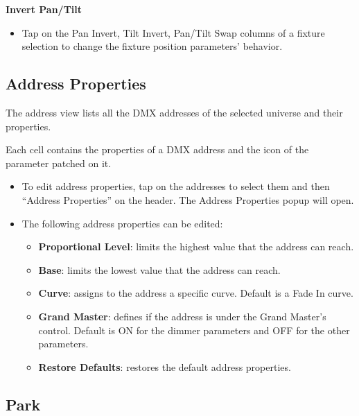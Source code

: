 \documentclass[
]{article}
\providecommand{\tightlist}{%
  \setlength{\itemsep}{0pt}\setlength{\parskip}{0pt}}
\begin{document}
\textbf{Invert Pan/Tilt}

\begin{itemize}
\tightlist
\item
  Tap on the Pan Invert, Tilt Invert, Pan/Tilt Swap columns of a fixture selection to change the fixture position parameters' behavior.
\end{itemize}

\hypertarget{Address-Properties-5.6}{%
\subsection{Address Properties}\label{Address-Properties-5.6}}

The address view lists all the DMX addresses of the selected universe and their properties.

Each cell contains the properties of a DMX address and the icon of the parameter patched on it.

\begin{itemize}
\tightlist
\item
  To edit address properties, tap on the addresses to select them and then ``Address Properties'' on the header. The Address Properties popup will open.
\end{itemize}

\begin{itemize}
\item
  The following address properties can be edited:

  \begin{itemize}
  \item
    \textbf{Proportional Level}: limits the highest value that the address can reach.
  \item
    \textbf{Base}: limits the lowest value that the address can reach.
  \item
    \textbf{Curve}: assigns to the address a specific curve. Default is a Fade In curve.
  \item
    \textbf{Grand Master}: defines if the address is under the Grand Master's control. Default is ON for the dimmer parameters and OFF for the other parameters.
  \item
    \textbf{Restore Defaults}: restores the default address properties.
  \end{itemize}
\end{itemize}

\hypertarget{Park-5.7}{%
\subsection{Park}\label{Park-5.7}}
\end{document}
